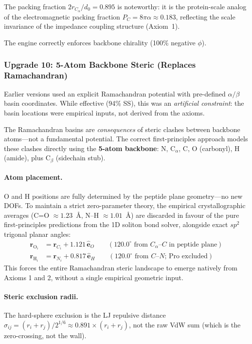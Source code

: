 The packing fraction $2r_{C_\alpha}/d_0 = 0.895$ is noteworthy: it is the protein-scale analog of the electromagnetic packing fraction $P_C = 8\pi\alpha \approx 0.183$, reflecting the scale invariance of the impedance coupling structure (Axiom~1).

The engine correctly enforces backbone chirality (100\% negative $\phi$).

\subsubsection{Upgrade 10: 5-Atom Backbone Steric (Replaces Ramachandran)}
\label{sec:5atom_steric}

Earlier versions used an explicit Ramachandran potential with pre-defined $\alpha/\beta$ basin coordinates.  While effective (94\% SS), this was an \emph{artificial constraint}: the basin locations were empirical inputs, not derived from the axioms.

The Ramachandran basins are \emph{consequences} of steric clashes between backbone atoms---not a fundamental potential.  The correct first-principles approach models these clashes directly using the \textbf{5-atom backbone}: N, C$_\alpha$, C, O (carbonyl), H (amide), plus C$_\beta$ (sidechain stub).

\paragraph{Atom placement.}
O and H positions are fully determined by the peptide plane geometry---no new DOFs. To maintain a strict zero-parameter theory, the empirical crystallographic averages (C=O $\approx 1.23$~\AA, N--H $\approx 1.01$~\AA) are discarded in favour of the pure first-principles predictions from the 1D soliton bond solver, alongside exact $sp^2$ trigonal planar angles:
\begin{align}
    \mathbf{r}_{\text{O}_i} &= \mathbf{r}_{C_i} + 1.121\,\hat{\mathbf{e}}_O \qquad (120.0^\circ \text{ from } C_\alpha\text{--}C \text{ in peptide plane}) \\
    \mathbf{r}_{\text{H}_i} &= \mathbf{r}_{N_i} + 0.817\,\hat{\mathbf{e}}_H \qquad (120.0^\circ \text{ from } C\text{--}N \text{; Pro excluded})
\end{align}
This forces the entire Ramachandran steric landscape to emerge natively from Axioms 1 and 2, without a single empirical geometric input.

\paragraph{Steric exclusion radii.}
The hard-sphere exclusion is the LJ repulsive distance $\sigma_{ij} = (r_i + r_j) / 2^{1/6} \approx 0.891 \times (r_i + r_j)$, not the raw VdW sum (which is the zero-crossing, not the wall).


